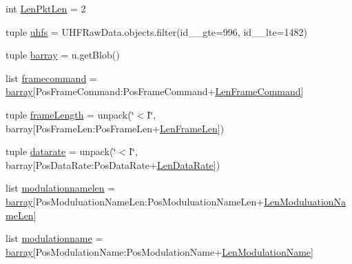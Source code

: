 \begin{DoxyCompactItemize}
\item 
int \hyperlink{namespace_simulators_1_1_tlmy_decode_test_abab63bf6dbfbf6a71ab527e95bf6c55f}{Len\+Pkt\+Len} = 2
\item 
tuple \hyperlink{namespace_simulators_1_1_tlmy_decode_test_aca60722530e1ef3e8cc6fb977720f7c4}{uhfs} = U\+H\+F\+Raw\+Data.\+objects.\+filter(id\+\_\+\+\_\+gte=996, id\+\_\+\+\_\+lte=1482)
\item 
tuple \hyperlink{namespace_simulators_1_1_tlmy_decode_test_a444bda3b0c9df222c86fe82e69c6fe1a}{barray} = u.\+get\+Blob()
\item 
list \hyperlink{namespace_simulators_1_1_tlmy_decode_test_abc48100736864a5549e661b7bc91cd4a}{framecommand} = \hyperlink{namespace_simulators_1_1_tlmy_decode_test_a444bda3b0c9df222c86fe82e69c6fe1a}{barray}\mbox{[}Pos\+Frame\+Command\+:\+Pos\+Frame\+Command+\hyperlink{namespace_simulators_1_1_tlmy_decode_test_a77da7f775045ecca5d656005d554f152}{Len\+Frame\+Command}\mbox{]}
\item 
tuple \hyperlink{namespace_simulators_1_1_tlmy_decode_test_ab02311f6bab529003adb6bf8acec1ae0}{frame\+Length} = unpack(\char`\"{}$<$I\char`\"{}, barray\mbox{[}Pos\+Frame\+Len\+:\+Pos\+Frame\+Len+\hyperlink{namespace_simulators_1_1_tlmy_decode_test_aa6ecc7c034ba7d263536e7029bc3a102}{Len\+Frame\+Len}\mbox{]})
\item 
tuple \hyperlink{namespace_simulators_1_1_tlmy_decode_test_a01545a669b8eb1c263cbdcf170cb3ea9}{datarate} = unpack(\char`\"{}$<$I\char`\"{}, barray\mbox{[}Pos\+Data\+Rate\+:\+Pos\+Data\+Rate+\hyperlink{namespace_simulators_1_1_tlmy_decode_test_aea72769294377163f46b0b20b1c0a8f5}{Len\+Data\+Rate}\mbox{]})
\item 
list \hyperlink{namespace_simulators_1_1_tlmy_decode_test_a86a6413ce18f4a4b2f3358ab2a48a6f8}{modulationnamelen} = \hyperlink{namespace_simulators_1_1_tlmy_decode_test_a444bda3b0c9df222c86fe82e69c6fe1a}{barray}\mbox{[}Pos\+Moduluation\+Name\+Len\+:\+Pos\+Moduluation\+Name\+Len+\hyperlink{namespace_simulators_1_1_tlmy_decode_test_aa9a9512971a5a5001fed85a4fb6b709f}{Len\+Moduluation\+Name\+Len}\mbox{]}
\item 
list \hyperlink{namespace_simulators_1_1_tlmy_decode_test_ad8b5f4b2ce7a6876c0832d15d6015186}{modulationname} = \hyperlink{namespace_simulators_1_1_tlmy_decode_test_a444bda3b0c9df222c86fe82e69c6fe1a}{barray}\mbox{[}Pos\+Modulation\+Name\+:\+Pos\+Modulation\+Name+\hyperlink{namespace_simulators_1_1_tlmy_decode_test_a45b3f41290d20a389265bc221465fd8e}{Len\+Modulation\+Name}\mbox{]}
\item 

\end{DoxyCompactItemize}
